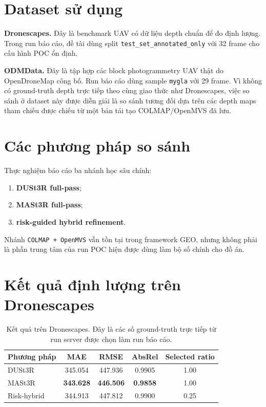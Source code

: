\documentclass[../DoAn.tex]{subfiles}
\begin{document}
\section{Dataset sử dụng}

\textbf{Dronescapes.} Đây là benchmark UAV có dữ liệu depth chuẩn để đo định lượng. Trong run báo cáo, đề tài dùng split \texttt{test\_set\_annotated\_only} với 32 frame cho cấu hình POC ổn định.

\textbf{ODMData.} Đây là tập hợp các block photogrammetry UAV thật do OpenDroneMap công bố. Run báo cáo dùng sample \texttt{mygla} với 29 frame. Vì không có ground-truth depth trực tiếp theo cùng giao thức như Dronescapes, việc so sánh ở dataset này được diễn giải là so sánh tương đối dựa trên các depth maps tham chiếu được chiếu từ một bản tái tạo COLMAP/OpenMVS đã lưu.

\section{Các phương pháp so sánh}

Thực nghiệm báo cáo ba nhánh học sâu chính:
\begin{enumerate}[leftmargin=1.5em]
  \item \textbf{DUSt3R full-pass};
  \item \textbf{MASt3R full-pass};
  \item \textbf{risk-guided hybrid refinement}.
\end{enumerate}

Nhánh \texttt{COLMAP + OpenMVS} vẫn tồn tại trong framework GEO, nhưng không phải là phần trung tâm của run POC hiện được dùng làm bộ số chính cho đồ án.

\section{Kết quả định lượng trên Dronescapes}

\begin{table}[t]
\centering
\small
\begin{tabular}{lcccc}
\toprule
\textbf{Phương pháp} & \textbf{MAE} & \textbf{RMSE} & \textbf{AbsRel} & \textbf{Selected ratio} \\
\midrule
DUSt3R & 345.054 & 447.936 & 0.9905 & 1.00 \\
MASt3R & \textbf{343.628} & \textbf{446.506} & \textbf{0.9858} & 1.00 \\
Risk-hybrid & 344.913 & 447.812 & 0.9900 & 0.25 \\
\bottomrule
\end{tabular}
\caption{Kết quả trên Dronescapes. Đây là các số ground-truth trực tiếp từ run server được chọn làm run báo cáo.}
\label{tab:dronescapes-thesis}
\end{table}
\end{document}
